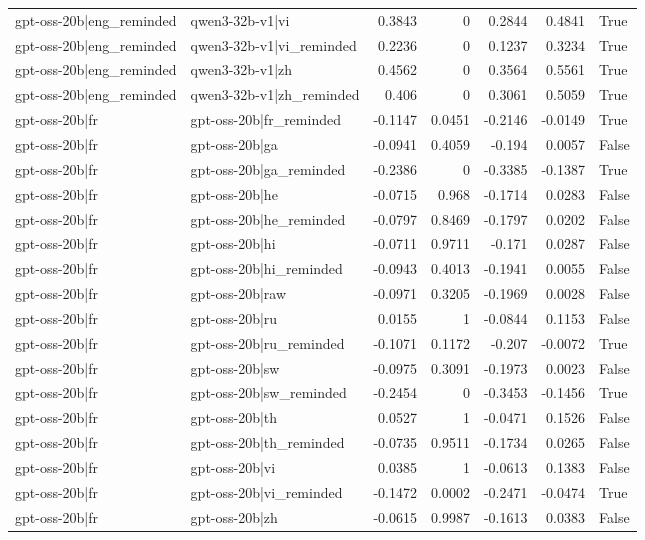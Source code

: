 \begin{table}
\begin{tabular}{l l r r r r l}
gpt-oss-20b|eng_reminded & qwen3-32b-v1|vi & 0.3843 & 0 & 0.2844 & 0.4841 & True \\
gpt-oss-20b|eng_reminded & qwen3-32b-v1|vi_reminded & 0.2236 & 0 & 0.1237 & 0.3234 & True \\
gpt-oss-20b|eng_reminded & qwen3-32b-v1|zh & 0.4562 & 0 & 0.3564 & 0.5561 & True \\
gpt-oss-20b|eng_reminded & qwen3-32b-v1|zh_reminded & 0.406 & 0 & 0.3061 & 0.5059 & True \\
gpt-oss-20b|fr & gpt-oss-20b|fr_reminded & -0.1147 & 0.0451 & -0.2146 & -0.0149 & True \\
gpt-oss-20b|fr & gpt-oss-20b|ga & -0.0941 & 0.4059 & -0.194 & 0.0057 & False \\
gpt-oss-20b|fr & gpt-oss-20b|ga_reminded & -0.2386 & 0 & -0.3385 & -0.1387 & True \\
gpt-oss-20b|fr & gpt-oss-20b|he & -0.0715 & 0.968 & -0.1714 & 0.0283 & False \\
gpt-oss-20b|fr & gpt-oss-20b|he_reminded & -0.0797 & 0.8469 & -0.1797 & 0.0202 & False \\
gpt-oss-20b|fr & gpt-oss-20b|hi & -0.0711 & 0.9711 & -0.171 & 0.0287 & False \\
gpt-oss-20b|fr & gpt-oss-20b|hi_reminded & -0.0943 & 0.4013 & -0.1941 & 0.0055 & False \\
gpt-oss-20b|fr & gpt-oss-20b|raw & -0.0971 & 0.3205 & -0.1969 & 0.0028 & False \\
gpt-oss-20b|fr & gpt-oss-20b|ru & 0.0155 & 1 & -0.0844 & 0.1153 & False \\
gpt-oss-20b|fr & gpt-oss-20b|ru_reminded & -0.1071 & 0.1172 & -0.207 & -0.0072 & True \\
gpt-oss-20b|fr & gpt-oss-20b|sw & -0.0975 & 0.3091 & -0.1973 & 0.0023 & False \\
gpt-oss-20b|fr & gpt-oss-20b|sw_reminded & -0.2454 & 0 & -0.3453 & -0.1456 & True \\
gpt-oss-20b|fr & gpt-oss-20b|th & 0.0527 & 1 & -0.0471 & 0.1526 & False \\
gpt-oss-20b|fr & gpt-oss-20b|th_reminded & -0.0735 & 0.9511 & -0.1734 & 0.0265 & False \\
gpt-oss-20b|fr & gpt-oss-20b|vi & 0.0385 & 1 & -0.0613 & 0.1383 & False \\
gpt-oss-20b|fr & gpt-oss-20b|vi_reminded & -0.1472 & 0.0002 & -0.2471 & -0.0474 & True \\
gpt-oss-20b|fr & gpt-oss-20b|zh & -0.0615 & 0.9987 & -0.1613 & 0.0383 & False \\

\end{tabular}
\end{table}
